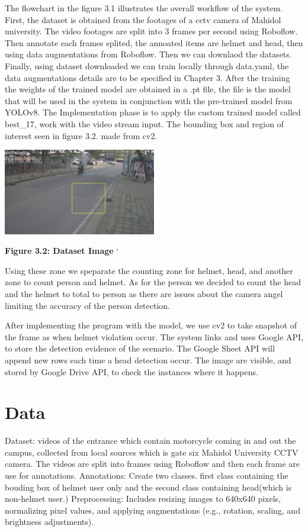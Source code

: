 The flowchart in the figure 3.1 illustrates the overall workflow of the system. First, the dataset is obtained from the footages of a cctv camera of Mahidol university. The video footages are split into 3 frames per second using Roboflow. Then annotate each frames splited, the annoated items are helmet and head, then using data augmentations from Roboflow. Then we can downlaod the datasets. Finally, using dataset downloaded we can train locally through data.yaml, the data augmentations details are to be specified in Chapter 3. After the training the weights of the trained model are obtained in a .pt file, the file is the model that will be used in the system in conjunction with the pre-trained model from YOLOv8. The Implementation phase is to apply the custom trained model called best\_17, work with the video stream input. The bounding box and region of interest seen in figure 3.2. made from cv2. 

	\begin{center}
	\includegraphics[width=0.5\textwidth]{ROI.png}
	
	\vspace{0.5em}
	\textbf{Figure 3.2: Dataset Image}
`\end{center}

Using these zone we speparate the counting zone for helmet, head, and another zone to count person and helmet. As for the person we decided to count the head and the helmet to total to person as there are issues about the camera angel limiting the accuracy of the person detection. 

After implementing the program with the model, we use cv2 to take snapshot of the frame as when helmet violation occur. The system links and uses Google API, to store the detection evidence of the scenario. The Google Sheet API will append new rows each time a head detection occur.  The image are visible, and stored by Google Drive API, to check the instances where it happens.

\section{Data}
Dataset: videos of the entrance which contain motorcycle coming in and out the campus, collected from local sources which is gate six Mahidol University CCTV camera. The videos are split into frames using Roboflow and then each frame are use for annotations.
\newline
\newline
Annotations: Create two classes. first class containing the bouding box of helmet user only and the second class containing head(which is non-helmet user.)
\newline
Preprocessing: Includes resizing images to 640x640 pixels, normalizing pixel values, and applying augmentations (e.g., rotation, scaling, and brightness adjustments).

